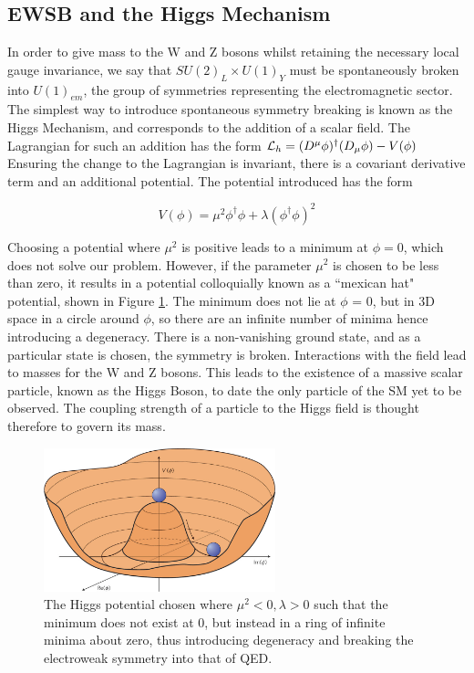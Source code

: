 \subsection{EWSB and the Higgs Mechanism}

In order to give mass to the W and Z bosons whilst retaining the necessary local gauge invariance, we say that $SU(2)_{L} \times U(1)_{Y}$ must be spontaneously broken into $U(1)_{em}$, the group of symmetries representing the electromagnetic sector. The simplest way to introduce spontaneous symmetry breaking is known as the Higgs Mechanism, and corresponds to the addition of a scalar field. The Lagrangian for such an addition has the form ${\mathcal{L}}_{h} = (D^{\mu}\phi)^{\dagger}(D_{\mu}\phi) - V(\phi)$  Ensuring the change to the Lagrangian is invariant, there is a covariant derivative term and an additional potential. The potential introduced has the form 

\begin{equation}
V(\phi) = \mu^{2}\phi^{\dagger}\phi + \lambda (\phi^{\dagger}\phi)^{2}
\end{equation}

Choosing a potential where $\mu^{2}$ is positive leads to a minimum at $\phi = 0$, which does not solve our problem. However, if the parameter $\mu^{2}$ is chosen to be less than zero, it results in a potential colloquially known as a ``mexican hat" potential, shown in Figure \ref{fig:MexicanHat}. The minimum does not lie at $\phi$ = 0, but in 3D space in a circle around $\phi$, so there are an infinite number of minima hence introducing a degeneracy. There is a non-vanishing ground state, and as a particular state is chosen, the symmetry is broken. Interactions with the field lead to masses for the W and Z bosons. This leads to the existence of a massive scalar particle, known as the Higgs Boson, to date the only particle of the SM yet to be observed. The coupling strength of a particle to the Higgs field is thought therefore to govern its mass.

\begin{figure}
\centering
\includegraphics[width=0.6\textwidth]{Figures/Theory/MHat}
\caption[The Higgs potential chosen where $\mu^{2} < 0, \lambda > 0$ introducing degeneracy and breaking the electroweak symmetry into that of QED.]{\label{fig:MexicanHat}The Higgs potential chosen where $\mu^{2} < 0, \lambda > 0$ such that the minimum does not exist at 0, but instead in a ring of infinite minima about zero, thus introducing degeneracy and breaking the electroweak symmetry into that of QED.~\cite{MexHat}}
\end{figure}

